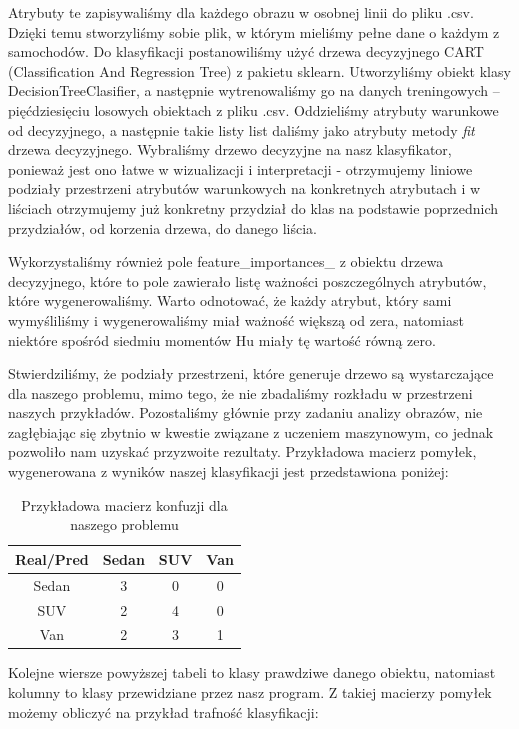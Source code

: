 \documentclass{article}
\begin{document}
Atrybuty te zapisywaliśmy dla każdego obrazu w osobnej linii do pliku .csv. Dzięki temu stworzyliśmy sobie plik, w którym mieliśmy pełne dane o każdym z samochodów. Do klasyfikacji postanowiliśmy użyć drzewa decyzyjnego CART (Classification And Regression Tree) z pakietu sklearn. Utworzyliśmy obiekt klasy DecisionTreeClasifier, a następnie wytrenowaliśmy go na danych treningowych -- pięćdziesięciu losowych obiektach z pliku .csv. Oddzieliśmy atrybuty warunkowe od decyzyjnego, a następnie takie listy list daliśmy jako atrybuty metody \textit{fit} drzewa decyzyjnego. Wybraliśmy drzewo decyzyjne na nasz klasyfikator, ponieważ jest ono łatwe w wizualizacji i interpretacji - otrzymujemy liniowe podziały przestrzeni atrybutów warunkowych na konkretnych atrybutach i w liściach otrzymujemy już konkretny przydział do klas na podstawie poprzednich przydziałów, od korzenia drzewa, do danego liścia.

Wykorzystaliśmy również pole feature\_importances\_ z obiektu drzewa decyzyjnego, które to pole zawierało listę ważności poszczególnych atrybutów, które wygenerowaliśmy. Warto odnotować, że każdy atrybut, który sami wymyśliliśmy i wygenerowaliśmy miał ważność większą od zera, natomiast niektóre spośród siedmiu momentów Hu miały tę wartość równą zero.

Stwierdziliśmy, że podziały przestrzeni, które generuje drzewo są wystarczające dla naszego problemu, mimo tego, że nie zbadaliśmy rozkładu w przestrzeni naszych przykładów. Pozostaliśmy głównie przy zadaniu analizy obrazów, nie zagłębiając się zbytnio w kwestie związane z uczeniem maszynowym, co jednak pozwoliło nam uzyskać przyzwoite rezultaty. Przykładowa macierz pomyłek, wygenerowana z wyników naszej klasyfikacji jest przedstawiona poniżej:
\begin{table}[h]
\begin{center}
\begin{tabular}{|c||c|c|c|}
\hline
Real/Pred & Sedan & SUV & Van\\
\hline
Sedan & 3 & 0 & 0\\
\hline
SUV & 2 & 4 & 0\\
\hline
Van & 2 & 3 & 1\\
\hline
\end{tabular}
\end{center}
\caption{Przykładowa macierz konfuzji dla naszego problemu}
\end{table}

Kolejne wiersze powyższej tabeli to klasy prawdziwe danego obiektu, natomiast kolumny to klasy przewidziane przez nasz program. Z takiej macierzy pomyłek możemy obliczyć na przykład trafność klasyfikacji:
\end{document}
